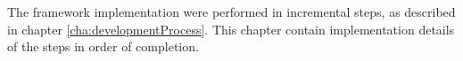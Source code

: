 
The framework implementation were performed in incremental steps, as described in chapter \ref{cha:developmentProcess}. This chapter contain implementation details of the steps in order of completion.